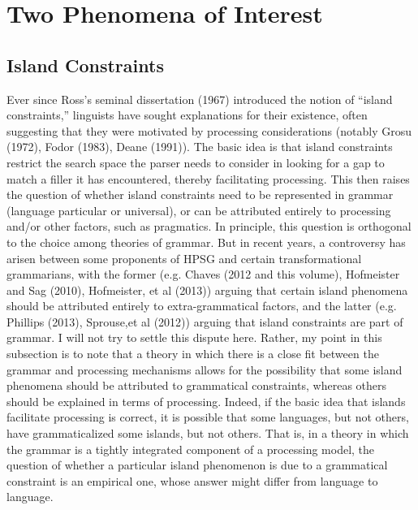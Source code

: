 \documentclass[a4paper]{article}
\begin{document}
\section{Two Phenomena of Interest}
\subsection{Island Constraints}

Ever since Ross's seminal dissertation (1967) introduced the notion of ``island constraints,'' linguists have sought explanations for their existence, often suggesting that they were motivated by processing considerations (notably Grosu (1972), Fodor (1983), Deane (1991)).  The basic idea is that island constraints restrict the search space the parser needs to consider in looking for a gap to match a filler it has encountered, thereby facilitating processing.  This then raises the question of whether island constraints need to be represented in grammar (language particular or universal), or can be attributed entirely to processing and/or other factors, such as pragmatics.
\newline
\newline
In principle, this question is orthogonal to the choice among theories of grammar.  But in recent years, a controversy has arisen between some proponents of HPSG and certain transformational grammarians, with the former (e.g. Chaves (2012 and this volume), Hofmeister and Sag (2010), Hofmeister, et al (2013)) arguing that certain island phenomena should be attributed entirely to extra-grammatical factors, and the latter (e.g. Phillips (2013), Sprouse,et al (2012)) arguing that island constraints are part of grammar.
\newline
\newline
I will not try to settle this dispute here.  Rather, my point in this subsection is to note that a theory in which there is a close fit between the grammar and processing mechanisms allows for the possibility that some island phenomena should be attributed to grammatical constraints, whereas others should be explained in terms of processing.  Indeed, if the basic idea that islands facilitate processing is correct, it is possible that some languages, but not others, have grammaticalized some islands, but not others.  That is, in a theory in which the grammar is a tightly integrated component of a processing model, the question of whether a particular island phenomenon is due to a grammatical constraint is an empirical one, whose answer might differ from language to language. 
\end{document}
